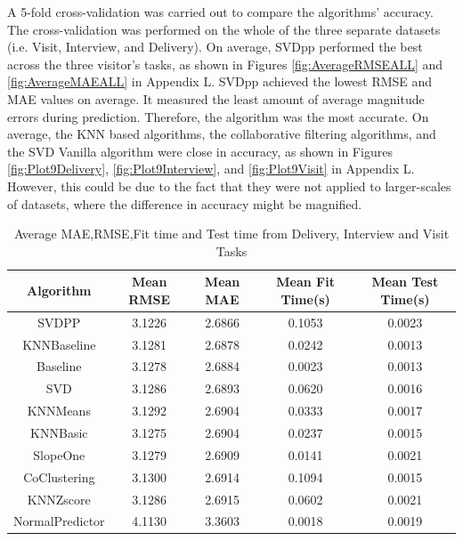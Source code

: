 \documentclass{aifyp}
\begin{document}
\newline
\newline
\indent A 5-fold cross-validation was carried out to compare the algorithms' accuracy. The cross-validation was performed on the whole of the three separate datasets (i.e. Visit, Interview, and Delivery). On average, SVDpp performed the best across the three visitor's tasks, as shown in Figures \ref{fig:AverageRMSEALL} and \ref{fig:AverageMAEALL} in Appendix L. SVDpp achieved the lowest RMSE and MAE values on average. It measured the least amount of average magnitude errors during prediction. Therefore, the algorithm was the most accurate. On average, the KNN based algorithms, the collaborative filtering algorithms, and the SVD Vanilla algorithm were close in accuracy, as shown in Figures \ref{fig:Plot9Delivery}, \ref{fig:Plot9Interview}, and \ref{fig:Plot9Visit} in Appendix L. However, this could be due to the fact that they were not applied to larger-scales of datasets, where the difference in accuracy might be magnified. 
\begin{table}[h]
\begin{center}
\begin{tabular}{|c|c|c|c|c|}
\hline
\textbf{Algorithm} & \textbf{Mean RMSE} & \textbf{Mean MAE} & \textbf{Mean Fit Time(s)} & \textbf{Mean Test Time(s)} \\ \hline
SVDPP & 3.1226 & 2.6866 & 0.1053 & 0.0023\\ \hline
KNNBaseline & 3.1281 & 2.6878 & 0.0242 & 0.0013\\ \hline
Baseline & 3.1278 & 2.6884 & 0.0023 & 0.0013\\ \hline
SVD & 3.1286 & 2.6893 & 0.0620 & 0.0016\\ \hline
KNNMeans & 3.1292 & 2.6904 & 0.0333 & 0.0017\\ \hline
KNNBasic & 3.1275 & 2.6904 & 0.0237 & 0.0015\\ \hline
SlopeOne & 3.1279 & 2.6909 & 0.0141 & 0.0021\\ \hline
CoClustering & 3.1300 & 2.6914 & 0.1094 & 0.0015\\ \hline
KNNZscore & 3.1286 & 2.6915 & 0.0602 & 0.0021\\ \hline
NormalPredictor & 4.1130 & 3.3603 & 0.0018 & 0.0019\\ \hline
\end{tabular}
\caption{Average MAE,RMSE,Fit time and Test time from Delivery, Interview and Visit Tasks}
\label{tab:MeanAlgorithmsComparisonOverAllTasks}
\end{center}
\end{table}
\end{document}

